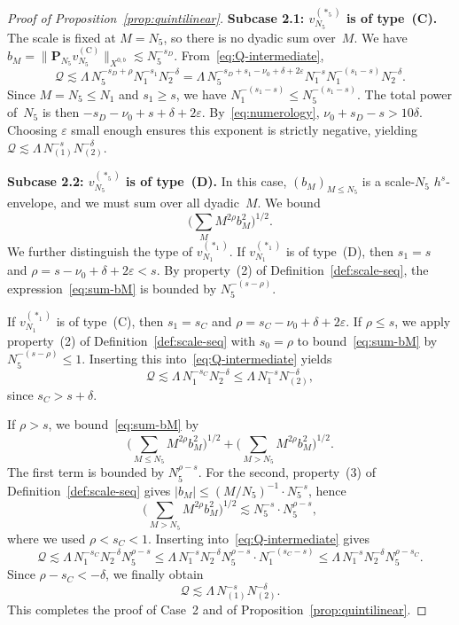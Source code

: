 \documentclass[10pt,a4paper]{amsart}
\renewcommand{\epsilon}{\varepsilon}
\begin{document}
\begin{proof}[Proof of Proposition~\ref{prop:quintilinear}]
\smallskip\noindent
\textbf{Subcase 2.1: $v_{N_5}^{(\ast_5)}$ is of type~(C).}
The scale is fixed at $M = N_5$, so there is no dyadic sum over~$M$. We have $b_M = \|\mathbf{P}_{N_5} v_{N_5}^{(\mathrm{C})}\|_{X^{0,b}} \lesssim N_5^{-s_D}$. From~\eqref{eq:Q-intermediate},
\[
\mathcal{Q} \lesssim \Lambda\, N_5^{-s_D+\rho} N_1^{-s_1} N_2^{-\delta} = \Lambda\, N_5^{-s_D + s_1 - \nu_0 + \delta + 2\epsilon} N_1^{-s} N_1^{-(s_1 - s)} N_2^{-\delta}.
\]
Since $M = N_5 \le N_1$ and $s_1 \ge s$, we have $N_1^{-(s_1 - s)} \le N_5^{-(s_1 - s)}$. The total power of~$N_5$ is then $-s_D - \nu_0 + s + \delta + 2\epsilon$.
By~\eqref{eq:numerology}, $\nu_0 + s_D - s > 10\delta$. Choosing $\epsilon$ small enough ensures this exponent is strictly negative, yielding $\mathcal{Q} \lesssim \Lambda\, N_{(1)}^{-s} N_{(2)}^{-\delta}$.

\smallskip\noindent
\textbf{Subcase 2.2: $v_{N_5}^{(\ast_5)}$ is of type~(D).}
In this case, $(b_M)_{M \le N_5}$ is a scale-$N_5$ $h^s$-envelope, and we must sum over all dyadic~$M$. We bound
\begin{equation}\label{eq:sum-bM}
	\Big(\sum_{M} M^{2\rho} b_M^2\Big)^{1/2}.
\end{equation}
We further distinguish the type of $v_{N_1}^{(\ast_1)}$. If $v_{N_1}^{(\ast_1)}$ is of type~(D), then $s_1=s$ and $\rho=s-\nu_0+\delta+2\epsilon<s$. By property~(2) of Definition~\ref{def:scale-seq}, the expression~\eqref{eq:sum-bM} is bounded by $N_5^{-(s-\rho)}$.

If $v_{N_1}^{(\ast_1)}$ is of type~(C), then $s_1=s_C$ and $\rho=s_C-\nu_0+\delta+2\epsilon$. If $\rho\leq s$, we apply property~(2) of Definition~\ref{def:scale-seq} with $s_0=\rho$ to bound~\eqref{eq:sum-bM} by $N_5^{-(s-\rho)}\leq 1$. Inserting this into~\eqref{eq:Q-intermediate} yields
\[
\mathcal{Q}\lesssim \Lambda\, N_1^{-s_C}N_2^{-\delta}\leq \Lambda\, N_1^{-s}N_{(2)}^{-\delta},
\]
since $s_C>s+\delta$.

If $\rho>s$, we bound~\eqref{eq:sum-bM} by
\[
\Big(\sum_{M\leq N_5}M^{2\rho}b_M^2\Big)^{1/2}+\Big(\sum_{M>N_5}M^{2\rho}b_M^2\Big)^{1/2}.
\]
The first term is bounded by $N_5^{\rho-s}$. For the second, property~(3) of Definition~\ref{def:scale-seq} gives $|b_M|\leq (M/N_5)^{-1}\cdot N_5^{-s}$, hence
\[
\Big(\sum_{M>N_5}M^{2\rho} b_M^2\Big)^{1/2}\lesssim N_5^{-s}\cdot N_5^{\rho-s},
\]
where we used $\rho<s_C<1$. Inserting into~\eqref{eq:Q-intermediate} gives
\[
\mathcal{Q}\lesssim \Lambda\, N_1^{-s_C}N_2^{-\delta}N_5^{\rho-s}\leq \Lambda\, N_1^{-s}N_2^{-\delta}N_5^{\rho-s}\cdot N_1^{-(s_C-s)}\leq \Lambda\, N_1^{-s}N_2^{-\delta}N_5^{\rho-s_C}.
\]
Since $\rho-s_C<-\delta$, we finally obtain
\[
\mathcal{Q}\lesssim \Lambda\, N_{(1)}^{-s}N_{(2)}^{-\delta}.
\]
This completes the proof of Case~2 and of Proposition~\ref{prop:quintilinear}.
\end{proof}
\end{document}
